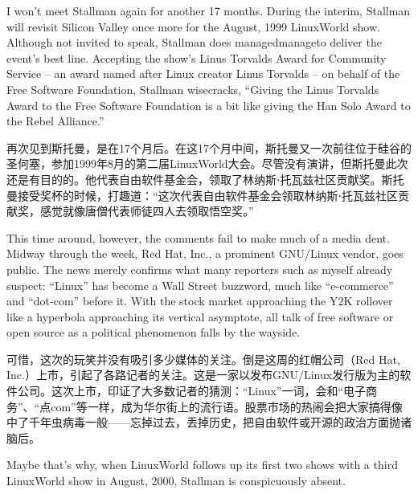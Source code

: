 \ifdefined\eng
I won't meet Stallman again for another 17 months. During the interim, Stallman will revisit Silicon Valley once more for the August, 1999 LinuxWorld show. Although not invited to speak, Stallman does \ifdefined\vone managed\fi\ifdefined\vtwo manage\fi to deliver the event's best line. Accepting the show's Linus Torvalds Award for Community Service -- an award named after Linux creator Linus Torvalds -- on behalf of the Free Software Foundation, Stallman wisecracks, ``Giving the Linus Torvalds Award to the Free Software Foundation is a bit like giving the Han Solo Award to the Rebel Alliance.''
\fi

\ifdefined\chs
再次见到斯托曼，是在17个月后。在这17个月中间，斯托曼又一次前往位于硅谷的圣何塞，参加1999年8月的第二届LinuxWorld大会。尽管没有演讲，但斯托曼此次还是有目的的。他代表自由软件基金会，领取了林纳斯⋅托瓦兹社区贡献奖。斯托曼接受奖杯的时候，打趣道：``这次代表自由软件基金会领取林纳斯⋅托瓦兹社区贡献奖，感觉就像唐僧代表师徒四人去领取悟空奖。''
\fi

\ifdefined\eng
This time around, however, the comments fail to make much of a media dent. Midway through the week, Red Hat, Inc., a prominent GNU/Linux vendor, goes public. The news merely confirms what many reporters such as myself already suspect: ``Linux'' has become a Wall Street buzzword, much like ``e-commerce'' and ``dot-com'' before it. With the stock market approaching the Y2K rollover like a hyperbola approaching its vertical asymptote, all talk of free software or open source as a political phenomenon falls by the wayside.
\fi

\ifdefined\chs
可惜，这次的玩笑并没有吸引多少媒体的关注。倒是这周的红帽公司（Red Hat, Inc.）上市，引起了各路记者的关注。这是一家以发布GNU/Linux发行版为主的软件公司。这次上市，印证了大多数记者的猜测：``Linux''一词，会和``电子商务''、``点com''等一样，成为华尔街上的流行语。股票市场的热闹会把大家搞得像中了千年虫病毒一般——忘掉过去，丢掉历史，把自由软件或开源的政治方面抛诸脑后。
\fi

\ifdefined\eng
Maybe that's why, when LinuxWorld follows up its first two shows with a third LinuxWorld show in August, 2000, Stallman is conspicuously absent.
\fi

